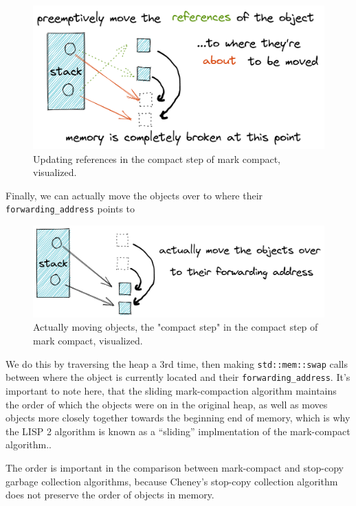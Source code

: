 \documentclass[index]{subfiles}
\begin{document}
\begin{figure}[H]
    \centering
    \includegraphics[scale=0.3]{pics/update-references.png}
    \caption{Updating references in the compact step of mark compact, visualized.}
\end{figure}

Finally, we can actually move the objects over to where their \verb+forwarding_address+ points to

\begin{figure}[H]
    \centering
    \includegraphics[scale=0.25]{pics/actually-move.png}
    \caption{Actually moving objects, the "compact step" in the compact step of mark compact, visualized.}
\end{figure}

We do this by traversing the heap a 3rd time, then making \texttt{std::mem::swap} calls between where the object is currently located and their \verb+forwarding_address+. It's important to note here, that the sliding mark-compaction algorithm maintains the order of which the objects were on in the original heap, as well as moves objects more closely together towards the beginning end of memory, which is why the LISP 2 algorithm is known as a ``sliding'' implmentation of the mark-compact algorithm..

The order is important in the comparison between mark-compact and stop-copy garbage collection algorithms, because Cheney's stop-copy collection algorithm does not preserve the order of objects in memory.
\end{document}
